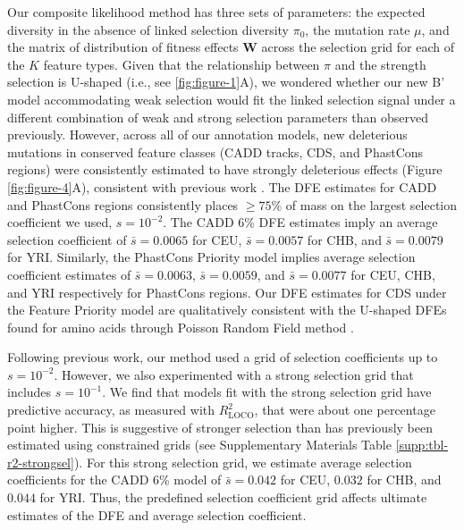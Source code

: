 \documentclass[11pt]{article}
\begin{document}
Our composite likelihood method has three sets of parameters: the expected
diversity in the absence of linked selection diversity $\pi_0$, the mutation
rate $\mu$, and the matrix of distribution of fitness effects $\mathbf{W}$
across the selection grid for each of the $K$ feature types. Given that the
relationship between $\pi$ and the strength selection is U-shaped (i.e., see \ref{fig:figure-1}A), we wondered
whether our new B' model accommodating weak selection would fit the linked
selection signal under a different combination of weak and strong selection
parameters than observed previously.
However, across all of our annotation models, new deleterious mutations in
conserved feature classes (CADD tracks, CDS, and PhastCons regions) were
consistently estimated to have strongly deleterious effects (Figure
\ref{fig:figure-4}A), consistent with previous work
\parencite{McVicker2009-ax,Murphy2022-sj}. The DFE estimates for CADD and
PhastCons regions consistently places $\ge 75\%$ of mass on the largest
selection coefficient we used, $s=10^{-2}$. The CADD 6\% DFE estimates imply an average
selection coefficient of $\bar{s} = 0.0065$ for CEU, $\bar{s} = 0.0057$ for
CHB, and $\bar{s} = 0.0079$ for YRI. Similarly, the PhastCons Priority model
implies average selection coefficient estimates of $\bar{s} = 0.0063$, $\bar{s}
= 0.0059$, and $\bar{s}= 0.0077$ for CEU, CHB, and YRI respectively for
PhastCons regions. Our DFE estimates for CDS under the Feature Priority model
are qualitatively consistent with the U-shaped DFEs found for amino acids
through Poisson Random Field method \parencite{Boyko2008-tj}.

Following previous work, our method used a grid of selection coefficients up to
$s=10^{-2}$. However, we also experimented with a strong selection grid that
includes $s=10^{-1}$. We find that models fit with the strong selection grid 
have predictive accuracy, as measured with $R_\text{LOCO}^2$, that were about one percentage point higher. This is suggestive of stronger selection than has previously been estimated using
constrained grids (see Supplementary Materials Table
\ref{supp:tbl-r2-strongsel}). For this strong selection grid, we estimate
average selection coefficients for the CADD 6\% model of $\bar{s} = 0.042$ for
CEU, $0.032$ for CHB, and $0.044$ for YRI. Thus, the predefined selection coefficient grid affects ultimate estimates of the DFE and average selection coefficient.
\end{document}
